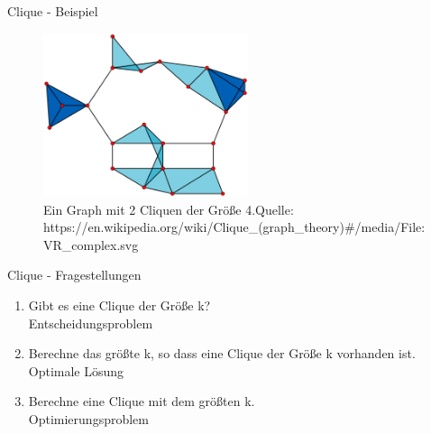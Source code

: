 \documentclass[12pt,donthandout,notes=dontshow,xcolor=table]{beamer}
\begin{document}
\begin{frame}{Clique - Beispiel}
\begin{figure}
\includegraphics[width=6cm]{figures/clique2.png}
\caption{Ein Graph mit 2 Cliquen der Größe 4.\newline \newline \tiny Quelle: https://en.wikipedia.org/wiki/Clique\_(graph\_theory)\#/media/File:VR\_complex.svg}
\end{figure}
\end{frame}

\begin{frame}{Clique - Fragestellungen}
\begin{enumerate}
\item Gibt es eine Clique der Größe k?\\
\textrightarrow Entscheidungsproblem
\newline \pause
\item Berechne das größte k, so dass eine Clique der Größe k vorhanden ist.\\
\textrightarrow Optimale Lösung
\newline \pause
\item Berechne eine Clique mit dem größten k.\\
\textrightarrow Optimierungsproblem
\end{enumerate}
\end{frame}
\end{document}
